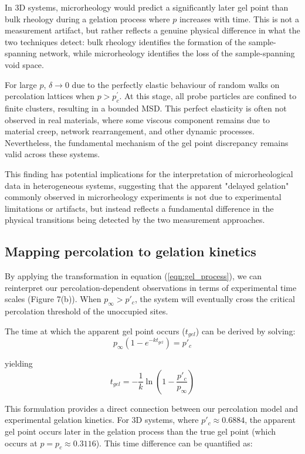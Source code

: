\documentclass[%
 aip,
 amsmath,amssymb,
reprint, onecolumn %
]{revtex4-1}
\begin{document}
In 3D systems, microrheology would predict a significantly later gel point than bulk rheology during a gelation process where $p$ increases with time. This is not a measurement artifact, but rather reflects a genuine physical difference in what the two techniques detect: bulk rheology identifies the formation of the sample-spanning network, while microrheology identifies the loss of the sample-spanning void space\cite{Rich2011, Oppong2006, deBruyn2013,Valentine2001}.

For large $p$, $\delta \rightarrow 0$ due to the perfectly elastic behaviour of random walks on percolation lattices when $p > p_{c}^{'}$. At this stage, all probe particles are confined to finite clusters, resulting in a bounded MSD. This perfect elasticity is often not observed in real materials, where some viscous component remains due to material creep, network rearrangement, and other dynamic processes. Nevertheless, the fundamental mechanism of the gel point discrepancy remains valid across these systems.

This finding has potential implications for the interpretation of microrheological data in heterogeneous systems, suggesting that the apparent "delayed gelation" commonly observed in microrheology experiments is not due to experimental limitations or artifacts, but instead reflects a fundamental difference in the physical transitions being detected by the two measurement approaches.

\subsection{Mapping percolation to gelation kinetics}

By applying the transformation in equation (\ref{eqn:gel_process}), we can reinterpret our percolation-dependent observations in terms of experimental time scales (Figure 7(b)). When $p_\infty > p'_c$, the system will eventually cross the critical percolation threshold of the unoccupied sites.

The time at which the apparent gel point occurs ($t_{gel}$) can be derived by solving: 
\begin{equation}
p_\infty(1-e^{-kt_{gel}}) = p'_c
\end{equation}

yielding 
\begin{equation}
t_{gel} = -\frac{1}{k}\ln\left(1-\frac{p'_c}{p_\infty}\right)
\end{equation}

This formulation provides a direct connection between our percolation model and experimental gelation kinetics. For 3D systems, where $p'_c \approx 0.6884$, the apparent gel point occurs later in the gelation process than the true gel point (which occurs at $p = p_c \approx 0.3116$). This time difference can be quantified as:
\end{document}
